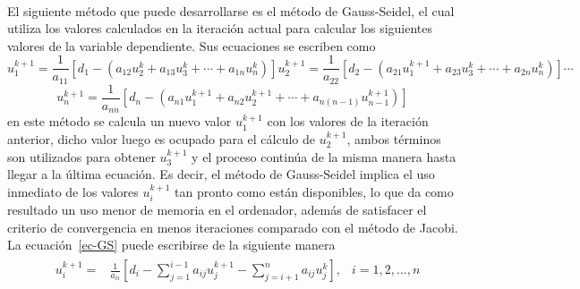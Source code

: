 \documentclass[letterpaper, openright, 12pt]{book}
\begin{document}
    \paragraph*{}
    El siguiente método que puede desarrollarse es el método de Gauss-Seidel,
    el cual utiliza los valores calculados en la iteración actual para
    calcular los siguientes valores de la variable dependiente. Sus
    ecuaciones se escriben como
    \begin{subequations}
        \begin{equation*}
            u_{1}^{k+1} = \frac{1}{a_{11}} \left[ d_{1} - \left( a_{12}u_{2}^{k} + a_{13}u_{3}^{k} + \dotsb + a_{1n}u_{n}^k \right) \right]
        \end{equation*}
        \begin{equation*}
            u_{2}^{k+1} = \frac{1}{a_{22}} \left[ d_{2} - \left( a_{21}u_{1}^{k+1} + a_{23}u_{3}^{k} + \dotsb + a_{2n}u_{n}^{k} \right) \right]
        \end{equation*}
        \begin{equation*}
            \dotsb
        \end{equation*}
    \end{subequations}
    \begin{equation}
        u_{n}^{k+1} = \frac{1}{a_{nn}} \left[ d_{n} - \left( a_{n1}u_{1}^{k+1} + a_{n2}u_{2}^{k+1} + \dotsb + a_{n\left( n-1 \right)}u_{n-1}^{k+1} \right) \right]
        \label{ec-GS}
    \end{equation}
    en este método se calcula un nuevo valor $u_{1}^{k+1}$ con los valores
    de la iteración anterior, dicho valor luego es ocupado para
    el cálculo de $u_{2}^{k+1}$, ambos términos son utilizados para obtener
    $u_{3}^{k+1}$ y el proceso continúa de la misma manera hasta llegar a
    la última ecuación. Es decir, el método de Gauss-Seidel implica el uso
    inmediato de los valores $u_{i}^{k+1}$ tan pronto como están disponibles,
    lo que da como resultado un uso menor de memoria en el ordenador, además
    de satisfacer el criterio de convergencia en menos iteraciones comparado
    con el método de Jacobi. La ecuación~\ref{ec-GS} puede escribirse de la
    siguiente manera
    \begin{align}
        &\begin{aligned}
            u_{i}^{k+1} =& \frac{1}{a_{ii}} \left[ d_{i} - \sum_{j=1}^{i-1} a_{ij}u_{j}^{k+1}  - \sum_{j = i + 1}^{n} a_{ij}u_{j}^{k} \right], &i = 1, 2, \dotsc, n
        \end{aligned}
        \label{ec-GS-2}
    \end{align}
\end{document}
